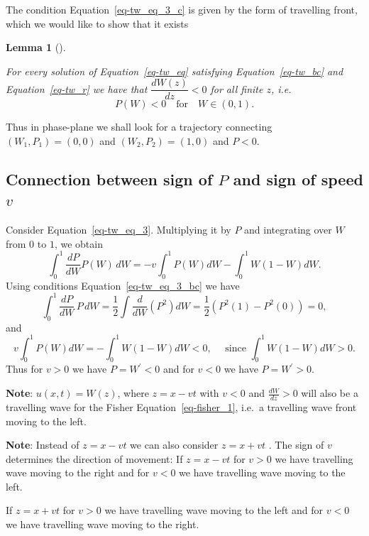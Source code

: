 \documentclass[
  letterpaper,
  DIV=11,
  numbers=noendperiod]{scrreprt}
\theoremstyle{plain}
\theoremstyle{definition}
\theoremstyle{plain}
\newtheorem{lemma}{Lemma}[chapter]
\theoremstyle{remark}
\begin{document}
The condition Equation~\ref{eq-tw_eq_3_c} is given by the form of
travelling front, which we would like to show that it exists

\begin{lemma}[]\protect\hypertarget{lem-trwave}{}\label{lem-trwave}

For every solution of Equation~\ref{eq-tw_eq} satisfying
Equation~\ref{eq-tw_bc} and Equation~\ref{eq-tw_r} we have that
\(\dfrac{dW(z)}{dz} <0\) for all finite \(z\), i.e.~ \[
P(W) < 0 \quad  \mathrm{for} \quad  W \in (0,1).
\]

\end{lemma}

Thus in phase-plane we shall look for a trajectory connecting
\((W_1, P_1)=(0,0)\) and \((W_2, P_2) = (1,0)\) and \(P<0\).

\hypertarget{connection-between-sign-of-p-and-sign-of-speed-v}{%
\subsection{\texorpdfstring{Connection between sign of \(P\) and sign of
speed
\(v\)}{Connection between sign of P and sign of speed v}}\label{connection-between-sign-of-p-and-sign-of-speed-v}}

Consider Equation~\ref{eq-tw_eq_3}. Multiplying it by \(P\) and
integrating over \(W\) from \(0\) to \(1\), we obtain \[
\int_0^1 \frac{dP}{dW}  P(W)\, dW = - v \int_0^1  P(W) dW - \int_0^1 W(1-W) dW.
\] Using conditions Equation~\ref{eq-tw_eq_3_bc} we have \[
\int_0^1 \frac{dP}{dW} \, P\, dW = \frac 12 \int  \frac{d}{dW} (P^2) dW = \frac 12\left( P^2(1) - P^2(0)\right) = 0,
\] and \[
  v \int_0^1  P(W) dW=  - \int_0^1 W(1-W) dW <0, \quad \text{ since } \int_0^1 W(1-W) dW >0. 
\] Thus for \(v>0\) we have \(P= W^\prime<0\) and for \(v<0\) we have
\(P= W^\prime>0\).

\textbf{Note}: \(u(x,t) = W(z)\), where \(z= x- vt\) with \(v<0\) and
\(\frac{ dW}{dz} >0\) will also be a travelling wave for the Fisher
Equation~\ref{eq-fisher_1}, i.e.~a travelling wave front moving to the
left.

\textbf{Note}: Instead of \(z = x - vt\) we can also consider
\(z=x+ vt\) . The sign of \(v\) determines the direction of movement: If
\(z = x - vt\) \quad for \(v>0\) we have travelling wave moving to the
right and for \(v<0\) we have travelling wave moving to the left.

If \(z = x + vt\) \quad for \(v>0\) we have travelling wave moving to
the left and for \(v<0\) we have travelling wave moving to the right.
\end{document}
